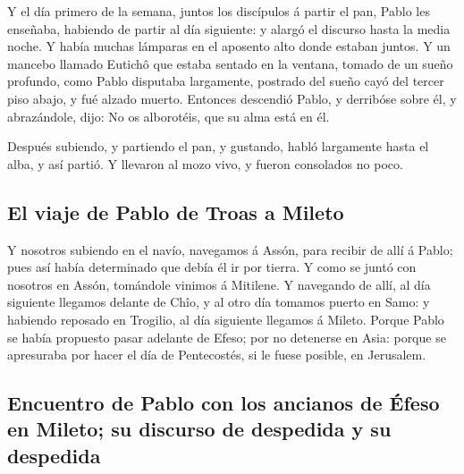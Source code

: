  Y el día primero de la semana, juntos los discípulos á
partir el pan, Pablo les enseñaba, habiendo de partir al día siguiente:
y alargó el discurso hasta la media noche.  Y había muchas
lámparas en el aposento alto donde estaban juntos.  Y un
mancebo llamado Eutichô que estaba sentado en la ventana, tomado de un
sueño profundo, como Pablo disputaba largamente, postrado del sueño cayó
del tercer piso abajo, y fué alzado muerto.  Entonces
descendió Pablo, y derribóse sobre él, y abrazándole, dijo: No os
alborotéis, que su alma está en él.

 Después subiendo, y partiendo el pan, y gustando, habló
largamente hasta el alba, y así partió.  Y llevaron al
mozo vivo, y fueron consolados no poco.

\hypertarget{el-viaje-de-pablo-de-troas-a-mileto}{%
\subsection{El viaje de Pablo de Troas a
Mileto}\label{el-viaje-de-pablo-de-troas-a-mileto}}

 Y nosotros subiendo en el navío, navegamos á Assón, para
recibir de allí á Pablo; pues así había determinado que debía él ir por
tierra.  Y como se juntó con nosotros en Assón, tomándole
vinimos á Mitilene.  Y navegando de allí, al día
siguiente llegamos delante de Chîo, y al otro día tomamos puerto en
Samo: y habiendo reposado en Trogilio, al día siguiente llegamos á
Mileto.  Porque Pablo se había propuesto pasar adelante
de Efeso; por no detenerse en Asia: porque se apresuraba por hacer el
día de Pentecostés, si le fuese posible, en Jerusalem.

\hypertarget{encuentro-de-pablo-con-los-ancianos-de-uxe9feso-en-mileto-su-discurso-de-despedida-y-su-despedida}{%
\subsection{Encuentro de Pablo con los ancianos de Éfeso en Mileto; su
discurso de despedida y su
despedida}\label{encuentro-de-pablo-con-los-ancianos-de-uxe9feso-en-mileto-su-discurso-de-despedida-y-su-despedida}}


